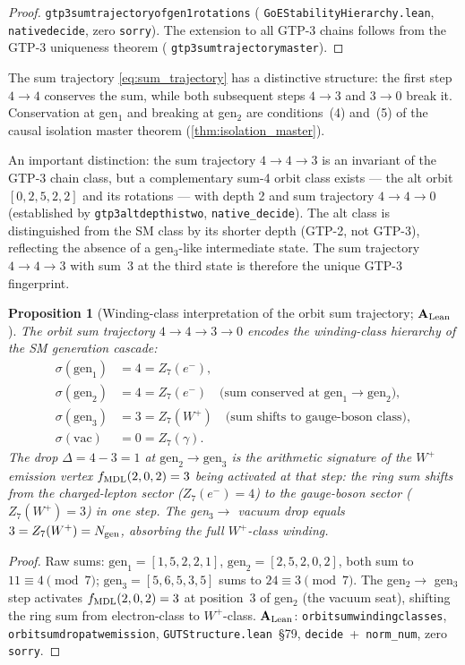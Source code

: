 \documentclass[11pt]{article}
\newtheorem{proposition}[theorem]{Proposition}
\theoremstyle{remark}
\newcommand{\lean}[1]{%
  \penalty-100
  \begingroup\def\_{\textunderscore\allowbreak}\texttt{#1}\endgroup}
\newcommand{\CatAL}{\ensuremath{\textbf{A}_{\rm Lean}}}
\begin{document}
\begin{proof}
\lean{gtp3\_sum\_trajectory\_\allowbreak{}of\_gen1\_rotations}
(\lean{GoEStabilityHierarchy.lean}, \lean{native\_decide}, zero \texttt{sorry}).
The extension to all GTP-3 chains follows from the GTP-3 uniqueness theorem
(\lean{gtp3\_sum\_trajectory\_master}).
\end{proof}

The sum trajectory \eqref{eq:sum_trajectory} has a distinctive structure:
the first step $4 \to 4$ conserves the sum, while both subsequent steps
$4 \to 3$ and $3 \to 0$ break it.
Conservation at gen$_1$ and breaking at gen$_2$ are conditions~(4) and~(5) of
the causal isolation master theorem (\cref{thm:isolation_master}).

An important distinction: the sum trajectory $4 \to 4 \to 3$ is an invariant
of the GTP-3 chain class, but a complementary sum-4 orbit class exists ---
the alt orbit $[0,2,5,2,2]$ and its rotations --- with depth 2 and sum trajectory
$4 \to 4 \to 0$ (established by \lean{gtp3\_alt\_depth\_is\_two}, \texttt{native\_decide}).
The alt class is distinguished from the SM class by its shorter depth (GTP-2, not GTP-3),
reflecting the absence of a gen$_3$-like intermediate state.
The sum trajectory $4 \to 4 \to 3$ with sum~3 at the third state is therefore the unique
GTP-3 fingerprint.

\begin{proposition}[Winding-class interpretation of the orbit sum trajectory; $\CatAL$]
\label{prop:sum_traj_winding}
The orbit sum trajectory $4 \to 4 \to 3 \to 0$ encodes the winding-class hierarchy of
the SM generation cascade:
\begin{align}
\sigma(\mathrm{gen}_1) &= 4 = Z_7(e^-), \\
\sigma(\mathrm{gen}_2) &= 4 = Z_7(e^-)  \quad\text{(sum conserved at } \mathrm{gen}_1 \to \mathrm{gen}_2\text{)},\\
\sigma(\mathrm{gen}_3) &= 3 = Z_7(W^+)  \quad\text{(sum shifts to gauge-boson class)},\\
\sigma(\mathrm{vac})   &= 0 = Z_7(\gamma).
\end{align}
The drop $\Delta = 4 - 3 = 1$ at $\mathrm{gen}_2 \to \mathrm{gen}_3$ is the arithmetic
signature of the $W^+$ emission vertex $f_{\rm MDL}(2,0,2)=3$ being activated at that
step: the ring sum shifts from the charged-lepton sector ($Z_7(e^-) = 4$) to the
gauge-boson sector ($Z_7(W^+) = 3$) in one step.
The gen$_3 \to$ vacuum drop equals $3 = Z_7(W^+) = N_{\rm gen}$, absorbing the
full $W^+$-class winding.
\end{proposition}
\begin{proof}
Raw sums: $\mathrm{gen}_1 = [1,5,2,2,1]$, $\mathrm{gen}_2 = [2,5,2,0,2]$, both sum to
$11 \equiv 4\pmod{7}$; $\mathrm{gen}_3 = [5,6,5,3,5]$ sums to $24 \equiv 3\pmod{7}$.
The gen$_2 \to$ gen$_3$ step activates $f_{\rm MDL}(2,0,2)=3$ at position~3 of gen$_2$
(the vacuum seat), shifting the ring sum from electron-class to $W^+$-class.
$\CatAL$: \lean{orbit\_sum\_winding\_classes}, \lean{orbit\_sum\_drop\_at\_wemission},
\texttt{GUTStructure.lean}~\S79, \texttt{decide}~+~\texttt{norm\_num}, zero \texttt{sorry}.
\end{proof}
\end{document}
